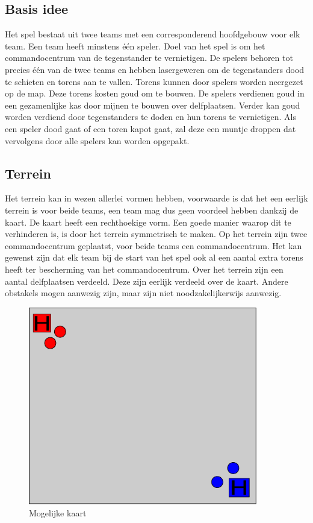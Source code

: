 \subsection{Basis idee}
Het spel bestaat uit twee teams met een corresponderend hoofdgebouw voor elk team. Een team heeft minstens \'e\'en speler. Doel van het spel is om het commandocentrum van de tegenstander te vernietigen. De spelers behoren tot precies \'e\'en van de twee teams en hebben lasergeweren om de tegenstanders dood te schieten en torens aan te vallen. Torens kunnen door spelers worden neergezet op de map. Deze torens kosten goud om te bouwen. De spelers verdienen goud in een gezamenlijke kas door mijnen te bouwen over delfplaatsen. Verder kan goud worden verdiend door tegenstanders te doden en hun torens te vernietigen. Als een speler dood gaat of een toren kapot gaat, zal deze een muntje droppen dat vervolgens door alle spelers kan worden opgepakt.

\subsection{Terrein}
Het terrein kan in wezen allerlei vormen hebben, voorwaarde is dat het een eerlijk terrein is voor beide teams, een team mag dus geen voordeel hebben dankzij de kaart. De kaart heeft een rechthoekige vorm. Een goede manier waarop dit te verhinderen is, is door het terrein symmetrisch te maken. Op het terrein zijn twee commandocentrum geplaatst, voor beide teams een commandocentrum. Het kan gewenst zijn dat elk team bij de start van het spel ook al een aantal extra torens heeft ter bescherming van het commandocentrum. Over het terrein zijn een aantal delfplaatsen verdeeld. Deze zijn eerlijk verdeeld over de kaart. Andere obstakels mogen aanwezig zijn, maar zijn niet noodzakelijkerwijs aanwezig.

\begin{figure}
\center
\includegraphics[width = 10cm]{Map1.eps}
\caption{Mogelijke kaart}
\label{fig:hist}
\end{figure}

